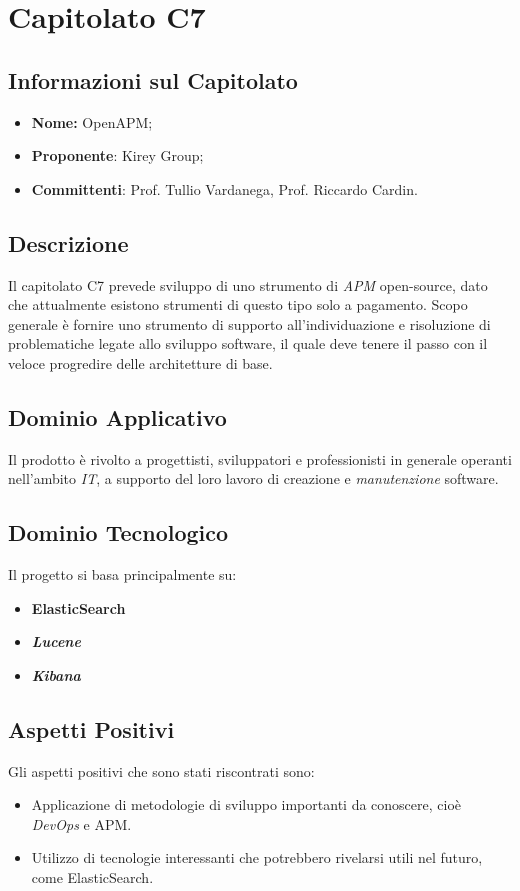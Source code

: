 \section{Capitolato C7}
\subsection{Informazioni sul Capitolato}
	\begin{itemize}
		\item \textbf{Nome:}
		OpenAPM;
		\item \textbf{Proponente}:
		Kirey Group;
		\item \textbf{Committenti}:
		Prof. Tullio Vardanega, Prof. Riccardo Cardin.
	\end{itemize}

\subsection{Descrizione}
	Il capitolato C7 prevede sviluppo di uno strumento di \textit{APM} open-source, dato che attualmente esistono strumenti di questo tipo solo a pagamento. Scopo generale è fornire uno strumento di supporto all'individuazione e risoluzione di problematiche legate allo sviluppo software, il quale deve tenere il passo con il veloce progredire delle architetture di base.
		
\subsection{Dominio Applicativo}
	Il prodotto è rivolto a progettisti, sviluppatori e professionisti in generale operanti nell'ambito \textit{IT}, a supporto del loro lavoro di creazione e \textit{manutenzione} software. 

\subsection{Dominio Tecnologico}
	Il progetto si basa principalmente su:
		\begin{itemize}
			\item \textbf{ElasticSearch}
			\item \textit{\textbf{Lucene}}
			\item \textit{\textbf{Kibana}}
		\end{itemize}

\subsection{Aspetti Positivi}
	Gli aspetti positivi che sono stati riscontrati sono:
	\begin{itemize}
	\item Applicazione di metodologie di sviluppo importanti da conoscere, cioè \textit{DevOps} e APM.
	\item Utilizzo di tecnologie interessanti che potrebbero rivelarsi utili nel futuro, come ElasticSearch.
	\end{itemize}

